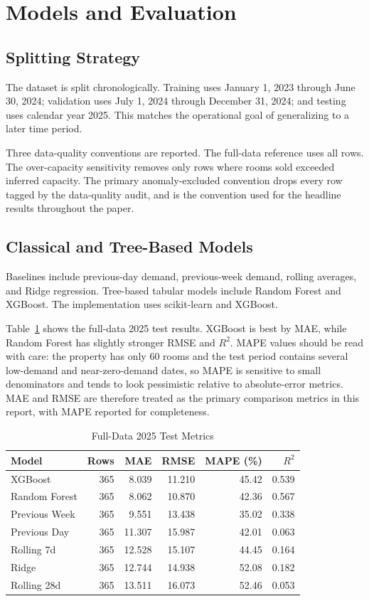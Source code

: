 \documentclass[conference]{IEEEtran}
\begin{document}
\section{Models and Evaluation}
\subsection{Splitting Strategy}
The dataset is split chronologically. Training uses January 1, 2023 through June 30, 2024; validation uses July 1, 2024 through December 31, 2024; and testing uses calendar year 2025. This matches the operational goal of generalizing to a later time period.

Three data-quality conventions are reported. The full-data reference uses all rows. The over-capacity sensitivity removes only rows where rooms sold exceeded inferred capacity. The primary anomaly-excluded convention drops every row tagged by the data-quality audit, and is the convention used for the headline results throughout the paper.

\subsection{Classical and Tree-Based Models}
Baselines include previous-day demand, previous-week demand, rolling averages, and Ridge regression. Tree-based tabular models include Random Forest and XGBoost. The implementation uses scikit-learn \cite{pedregosa2011scikit} and XGBoost.

Table~\ref{tab:baseline} shows the full-data 2025 test results. XGBoost is best by MAE, while Random Forest has slightly stronger RMSE and $R^2$. MAPE values should be read with care: the property has only 60 rooms and the test period contains several low-demand and near-zero-demand dates, so MAPE is sensitive to small denominators and tends to look pessimistic relative to absolute-error metrics. MAE and RMSE are therefore treated as the primary comparison metrics in this report, with MAPE reported for completeness.

\begin{table}[t]
\centering
\caption{Full-Data 2025 Test Metrics}
\label{tab:baseline}
\begin{tabular}{lrrrrr}
\toprule
Model & Rows & MAE & RMSE & MAPE (\%) & $R^2$\\
\midrule
XGBoost & 365 & 8.039 & 11.210 & 45.42 & 0.539\\
Random Forest & 365 & 8.062 & 10.870 & 42.36 & 0.567\\
Previous Week & 365 & 9.551 & 13.438 & 35.02 & 0.338\\
Previous Day & 365 & 11.307 & 15.987 & 42.01 & 0.063\\
Rolling 7d & 365 & 12.528 & 15.107 & 44.45 & 0.164\\
Ridge & 365 & 12.744 & 14.938 & 52.08 & 0.182\\
Rolling 28d & 365 & 13.511 & 16.073 & 52.46 & 0.053\\
\bottomrule
\end{tabular}
\end{table}
\end{document}
